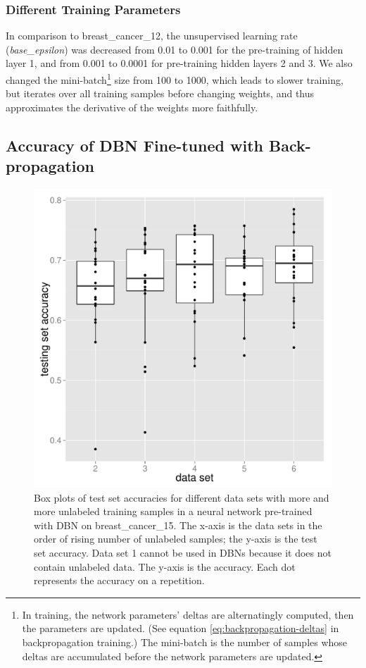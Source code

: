 \subsubsection{Different Training Parameters}

In comparison to breast\_cancer\_12, the unsupervised learning rate
(\emph{base\_epsilon}) was decreased from 0.01 to 0.001 for the pre-training
of hidden layer 1, and from 0.001 to 0.0001 for pre-training hidden
layers 2 and 3. We also changed the mini-batch\footnote{In training, the network parameters' deltas are alternatingly computed,
then the parameters are updated. (See equation \ref{eq:backpropagation-deltas}
in backpropagation training.) The mini-batch is the number of samples
whose deltas are accumulated before the network parameters are updated.} size from 100 to 1000, which leads to slower training, but iterates
over all training samples before changing weights, and thus approximates
the derivative of the weights more faithfully.

\subsection{Accuracy of DBN Fine-tuned with Back-propagation}

\begin{figure}
\begin{centering}
\includegraphics[width=0.68\columnwidth]{images/breast_cancer_15-accuracies-testing-aa_dv.pdf}
\par\end{centering}
\caption[Test set accuracies for different data sets with more and more unlabeled
training samples in a DBN on breast\_cancer\_15.]{\label{fig:Accuracy-in-breast_cancer_15}Box plots of test set accuracies
for different data sets with more and more unlabeled training samples
in a neural network pre-trained with DBN on breast\_cancer\_15. The
x-axis is the data sets in the order of rising number of unlabeled
samples; the y-axis is the test set accuracy. Data set 1 cannot be
used in DBNs because it does not contain unlabeled data. The y-axis
is the accuracy. Each dot represents the accuracy on a repetition.}
\end{figure}

